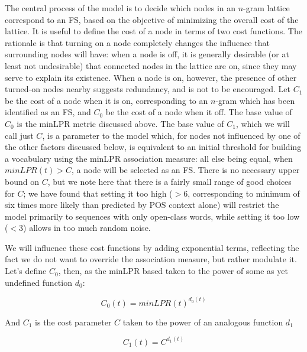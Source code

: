 \documentclass[11pt]{article}
\begin{document}
The central process of the model is to decide which nodes in an $n$-gram lattice correspond to an FS, based on the objective of minimizing the overall cost of the lattice. It is useful to define the cost of a node in terms of two cost functions. The rationale is that turning on a node completely changes the influence that surrounding nodes will have: when a node is off, it is generally desirable (or at least not undesirable) that connected nodes in the lattice are on, since they may serve to explain its existence. When a node is on, however, the presence of other turned-on nodes nearby suggests redundancy, and is not to be encouraged. Let $C_{1}$ be the cost of a node when it is on, corresponding to an $n$-gram which has been identified as an FS, and $C_{0}$ be the cost of a node when it off. The base value of $C_{0}$ is the minLPR metric discussed above. The base value of $C_{1}$, which we will call just $C$, is a parameter to the model which, for nodes not influenced by one of the other factors discussed below, is equivalent to an initial threshold for building a vocabulary using the minLPR association measure: all else being equal, when $minLPR(t) > C$, a node will be selected as an FS. There is no necessary upper bound on $C$, but we note here that there is a fairly small range of good choices for $C$; we have found that setting it too high ($>6$, corresponding to minimum of six times more likely than predicted by POS context alone) will restrict the model primarily to sequences with only open-class words, while setting it too low ($<3$) allows in too much random noise.


We will influence these cost functions by adding exponential terms, reflecting the fact we do not want to override the association measure, but rather modulate it. Let's define $C_0$, then, as the minLPR based taken to the power of some as yet undefined function $d_0$:

\begin{displaymath}
C_0(t) = minLPR(t)^{d_0(t)}
\end{displaymath}
\noident

And $C_1$ is the cost parameter $C$ taken to the power of an analogous function $d_1$

\begin{displaymath}
C_1(t) = C^{d_1(t)}
\end{displaymath}
\noident
\end{document}
